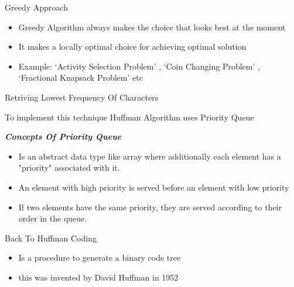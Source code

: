 \documentclass[12pt]{beamer}
\begin{document}
\begin{frame} {Greedy Approach}

	\begin{itemize}
		\item Greedy Algorithm always makes the choice that looks best at the moment
	
	\pause
	
	    \item It makes a locally optimal choice for achieving optimal solution 
	
	\pause
	
	     \item Example: `Activity Selection Problem' , `Coin Changing Problem' , `Fractional Knapsack Problem' etc 
	\end{itemize}
	



	
\end{frame}

\begin{frame} {Retriving Lowest Frequency Of Characters}
	
	\pause
	To implement this technique Huffman Algorithm uses Priority Queue 
	\pause
	
	\textbf{\textit{Concepts Of Priority Queue}}
	\begin{itemize}
		\item Is an abstract data type like array where additionally each element has a "priority" associated with it. 
		\item An element with high priority is served before an element with low priority
		\item If two elements have the same priority, they are served according to their order in the queue.
	\end{itemize}
	

	
\end{frame}

\begin{frame} {Back To Huffman Coding}
	\begin{itemize}
		\item Is a procedure to generate a binary code tree 
		\item this was invented by David Huffman in 1952 
	\end{itemize}
 		
 		
\end{frame}
\end{document}
